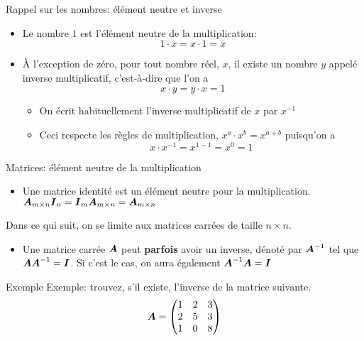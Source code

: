 \documentclass[french]{beamer}
\begin{document}
\begin{frame}{Rappel sur les nombres: élément neutre et inverse}
	\begin{itemize}
	\item Le nombre $1$ est l'élément neutre de la multiplication: 
	\[1\cdot x = x \cdot 1 = x\]
	\item À l'exception de zéro, pour tout nombre réel, $x$, il existe un nombre $y$ appelé
	      inverse multiplicatif, c'est-à-dire que l'on a 
	      \[x\cdot y = y\cdot x = 1\] 
	      \begin{itemize}
	      \item On écrit habituellement l'inverse multiplicatif de $x$ par $x^{-1}$
	      \item Ceci respecte les règles de multiplication, $x^a \cdot x^b = x^{a+b}$
	      puisqu'on a 
	      \[x \cdot x^{-1} = x^{1 - 1} = x^0 = 1\]
	      \end{itemize}
	\end{itemize}
\end{frame}

\begin{frame}{Matrices: élément neutre de la multiplication}
	\begin{itemize}
	\item Une matrice identité est un élément neutre pour la multiplication.
	$\boldsymbol{A}_{m\times n} \boldsymbol{I}_n = \boldsymbol{I}_m \boldsymbol{A}_{m\times n} = \boldsymbol{A}_{m\times n}$
	\end{itemize}
	Dans ce qui suit, on se limite aux matrices carrées de taille $n\times n$.
\begin{itemize}
\item Une matrice carrée $\boldsymbol{A}$ peut \textbf{parfois} avoir un inverse, dénoté par 
$\boldsymbol{A}^{-1}$ tel que 
$\boldsymbol{A} \boldsymbol{A}^{-1} = \boldsymbol{I}$.
Si c'est le cas, on aura également
$\boldsymbol{A}^{-1} \boldsymbol{A} = \boldsymbol{I}$ 
\end{itemize}
\end{frame}

\begin{frame}{Exemple}
Exemple: trouvez, s'il existe, l'inverse de la matrice suivante.
\[
\boldsymbol{A} = \begin{pmatrix}
1 & 2 & 3 \\
2 & 5 & 3 \\
1 & 0 & 8
\end{pmatrix}
\]
\end{frame}
\end{document}
